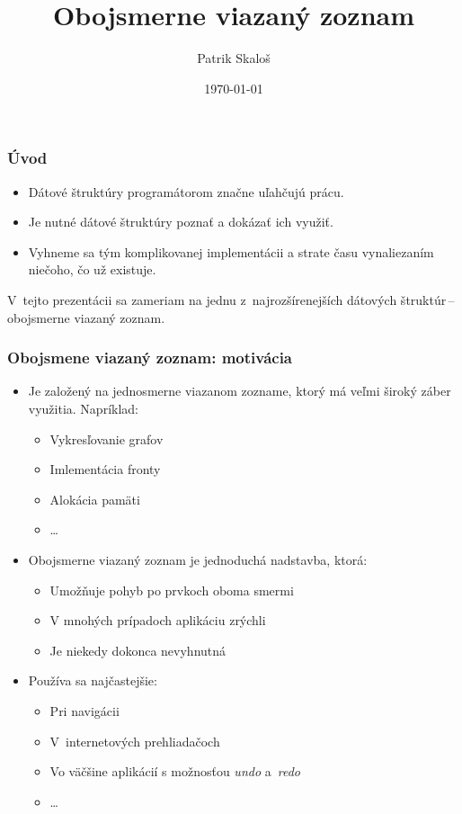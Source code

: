 \documentclass{beamer}
\title{Obojsmerne viazaný zoznam}
\author{Patrik Skaloš}
\date{\today}
\begin{document}
  \frame{\titlepage}

  \begin{frame}
    \frametitle{Úvod}
    \begin{itemize}
      \item Dátové štruktúry programátorom značne uľahčujú prácu.
      \item Je nutné dátové štruktúry poznať a dokázať ich využiť.
      \item Vyhneme sa tým komplikovanej implementácii a strate času
        vynaliezaním niečoho, čo už existuje.
    \end{itemize}
    \bigskip
    V~tejto prezentácii sa zameriam na jednu z~najrozšírenejších dátových 
    štruktúr\,--\,\color{blue}obojsmerne viazaný zoznam.
  \end{frame}

  \begin{frame}
    \frametitle{Obojsmene viazaný zoznam: motivácia}
    \begin{itemize}
      \item Je založený na jednosmerne viazanom zozname, ktorý má veľmi široký 
        záber využitia. Napríklad:
        \begin{itemize}
          \item Vykresľovanie grafov
          \item Imlementácia fronty
          \item Alokácia pamäti
          \item \dots
        \end{itemize}
        \pause
      \item Obojsmerne viazaný zoznam je jednoduchá nadstavba, ktorá:
        \begin{itemize}
          \item Umožňuje pohyb po prvkoch oboma smermi
          \item V mnohých prípadoch aplikáciu zrýchli
          \item Je niekedy dokonca nevyhnutná
        \end{itemize}
        \pause
      \item Používa sa najčastejšie:
        \begin{itemize}
          \item Pri navigácii 
          \item V~internetových prehliadačoch
          \item Vo väčšine aplikácií s možnosťou \textit{undo} a~\textit{redo}
          \item \dots
        \end{itemize}
    \end{itemize}
  \end{frame}
  
\end{document}
